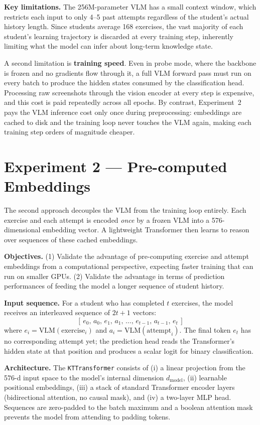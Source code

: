 \documentclass[10pt]{article}
\begin{document}
\textbf{Key limitations.} The 256M-parameter VLM has a small context window, which restricts each
input to only 4--5 past attempts regardless of the student's actual history length. Since students
average 168 exercises, the vast majority of each student's learning trajectory is discarded at
every training step, inherently limiting what the model can infer about long-term knowledge state.

A second limitation is \textbf{training speed}. Even in probe mode, where the backbone is frozen and
no gradients flow through it, a full VLM forward pass must run on every batch to produce the hidden
states consumed by the classification head. Processing raw screenshots through the vision encoder at
every step is expensive, and this cost is paid repeatedly across all epochs. By contrast, Experiment~2
pays the VLM inference cost only once during preprocessing: embeddings are cached to disk and the
training loop never touches the VLM again, making each training step orders of magnitude cheaper.

\section*{Experiment 2 --- Pre-computed Embeddings}

The second approach decouples the VLM from the training loop entirely. Each exercise and each
attempt is encoded \emph{once} by a frozen VLM into a 576-dimensional embedding vector. A
lightweight Transformer then learns to reason over sequences of these cached embeddings.

\textbf{Objectives.} (1) Validate the advantage of pre-computing exercise and attempt embeddings 
from a computational perspective, expecting faster training that can run on smaller GPUs. (2) Validate 
the advantage in terms of prediction performances of feeding the model a longer sequence of 
student history.

\textbf{Input sequence.} For a student who has completed $t$ exercises, the model 
receives an interleaved sequence of $2t+1$ vectors:
\[
[\,e_0,\,a_0,\,e_1,\,a_1,\,\ldots,\,e_{t-1},\,a_{t-1},\,e_t\,]
\]
where $e_i = \mathrm{VLM}(\text{exercise}_i)$ and $a_i = \mathrm{VLM}(\text{attempt}_i)$. The final 
token $e_t$ has no corresponding attempt yet; the prediction head reads the Transformer's hidden 
state at that position and produces a scalar logit for binary classification.

\textbf{Architecture.} The \texttt{KTTransformer} consists of (i) a linear projection from the 576-d 
input space to the model's internal dimension $d_\text{model}$, (ii) learnable positional 
embeddings, (iii) a stack of standard Transformer encoder layers (bidirectional attention, no causal mask), 
and (iv) a two-layer MLP head. Sequences are zero-padded to the batch maximum and a boolean attention
mask prevents the model from attending to padding tokens.
\end{document}
